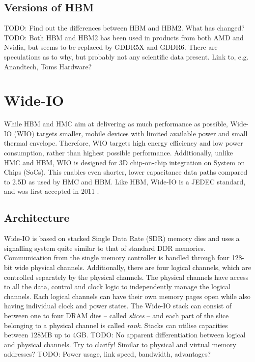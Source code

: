 \subsection{Versions of HBM}
TODO: Find out the differences between HBM and HBM2. What has changed? 
TODO: Both HBM and HBM2 has been used in products from both AMD and Nvidia, but seems to be replaced by GDDR5X and GDDR6. There are speculations as to why, but probably not any scientific data present. Link to, e.g. Anandtech, Toms Hardware?


\section{Wide-IO}
While HBM and HMC aim at delivering as much performance as possible, Wide-IO (WIO) targets smaller, mobile devices with limited available power and small thermal envelope. Therefore, WIO targets high energy efficiency and low power consumption, rather than highest possible performance. Additionally, unlike HMC and HBM, WIO is designed for 3D chip-on-chip integration on System on Chips (SoCs). This enables even shorter, lower capacitance data paths compared to 2.5D as used by HMC and HBM. Like HBM, Wide-IO is a JEDEC standard, and was first accepted in 2011 \cite{standard2011wide}. 

\subsection{Architecture}
Wide-IO is based on stacked Single Data Rate (SDR) memory dies and uses a signalling system quite similar to that of standard DDR memories. Communication from the single memory controller is handled through four 128-bit wide physical channels. Additionally, there are four logical channels, which are controlled separately by the physical channels. The physical channels have access to all the data, control and clock logic to independently manage the logical channels. Each logical channels can have their own memory pages open while also having individual clock and power states. The Wide-IO stack can consist of between one to four DRAM dies -- called \emph{slices} -- and each part of the slice belonging to a physical channel is called \emph{rank}. Stacks can utilise capacities between 128MB up to 4GB. TODO: No apparent differentiation between logical and physical channels. Try to clarify! Similar to physical and virtual memory addresses? 
TODO: Power usage, link speed, bandwidth, advantages?

